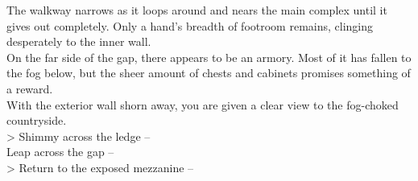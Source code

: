


The walkway narrows as it loops around and nears the main complex until it gives out completely. Only a hand’s breadth of footroom remains, clinging desperately to the inner wall.\\

On the far side of the gap, there appears to be an armory. Most of it has fallen to the fog below, but the sheer amount of chests and cabinets promises something of a reward.\\

With the exterior wall shorn away, you are given a clear view to the fog-choked countryside.\\

> Shimmy across the ledge -- \\
 Leap across the gap -- \\
> Return to the exposed mezzanine -- 